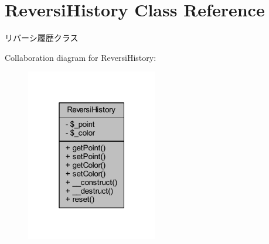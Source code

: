 \hypertarget{class_reversi_history}{}\section{Reversi\+History Class Reference}
\label{class_reversi_history}


リバーシ履歴クラス  




Collaboration diagram for Reversi\+History\+:\nopagebreak
\begin{figure}[H]
\begin{center}
\leavevmode
\includegraphics[width=163pt]{class_reversi_history__coll__graph}
\end{center}
\end{figure}
